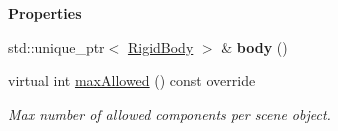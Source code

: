 \begin{Indent}\textbf{ Properties}\par
\begin{DoxyCompactItemize}
\item 
\mbox{\label{classrev_1_1_rigid_body_component_a1e456eb31d2256a0b767cb5a7bbba6db}} 
std\+::unique\+\_\+ptr$<$ \mbox{\hyperlink{classrev_1_1_rigid_body}{Rigid\+Body}} $>$ \& {\bfseries body} ()
\item 
\mbox{\label{classrev_1_1_rigid_body_component_a993d378bf041f1cec6c941b1f64b3e48}} 
virtual int \mbox{\hyperlink{classrev_1_1_rigid_body_component_a993d378bf041f1cec6c941b1f64b3e48}{max\+Allowed}} () const override
\begin{DoxyCompactList}\small\item\em Max number of allowed components per scene object. \end{DoxyCompactList}\end{DoxyCompactItemize}
\end{Indent}
